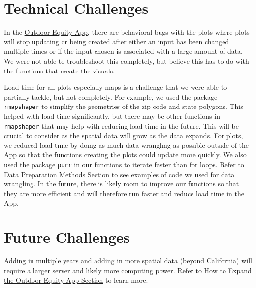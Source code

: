 \documentclass[
  11 pt,
  openany]{book}
\begin{document}
\hypertarget{technical-challenges}{%
\section{Technical Challenges}\label{technical-challenges}}

In the \href{https://shinyapps.bren.ucsb.edu/oe_app/}{Outdoor Equity App}, there are behavioral bugs with the plots where plots will stop updating or being created after either an input has been changed multiple times or if the input chosen is associated with a large amount of data. We were not able to troubleshoot this completely, but believe this has to do with the functions that create the visuals.

Load time for all plots especially maps is a challenge that we were able to partially tackle, but not completely. For example, we used the package \texttt{rmapshaper} \citep{R-rmapshaper} to simplify the geometries of the zip code and state polygons. This helped with load time significantly, but there may be other functions in \texttt{rmapshaper} \citep{R-rmapshaper} that may help with reducing load time in the future. This will be crucial to consider as the spatial data will grow as the data expands. For plots, we reduced load time by doing as much data wrangling as possible outside of the App so that the functions creating the plots could update more quickly. We also used the package \texttt{purr} \citep{R-purrr} in our functions to iterate faster than for loops. Refer to \protect\hyperlink{data-preparation-methods}{Data Preparation Methods Section} to see examples of code we used for data wrangling. In the future, there is likely room to improve our functions so that they are more efficient and will therefore run faster and reduce load time in the App.

\hypertarget{future-challenges}{%
\section{Future Challenges}\label{future-challenges}}

Adding in multiple years and adding in more spatial data (beyond California) will require a larger server and likely more computing power. Refer to \protect\hyperlink{how-to-expand-the-outdoor-equity-app}{How to Expand the Outdoor Equity App Section} to learn more.

  
\end{document}
